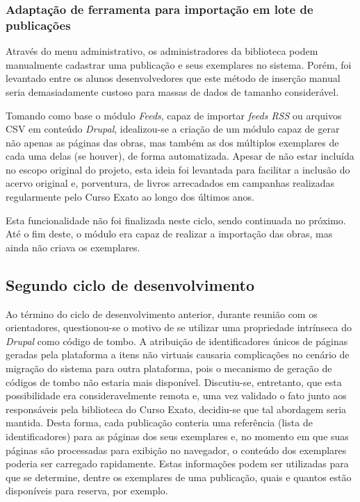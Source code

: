 \documentclass[a4paper]{article}
\begin{document}
\subsubsection{Adaptação de ferramenta para importação em lote de publicações}
Através do menu administrativo, os administradores da biblioteca podem manualmente cadastrar uma publicação e seus exemplares no sistema. Porém, foi levantado entre os alunos desenvolvedores que este método de inserção manual seria demasiadamente custoso para massas de dados de tamanho considerável.

Tomando como base o módulo \textit{Feeds}, capaz de importar \textit{feeds RSS} ou arquivos CSV em conteúdo \textit{Drupal}, idealizou-se a criação de um módulo capaz de gerar não apenas as páginas das obras, mas também as dos múltiplos exemplares de cada uma delas (se houver), de forma automatizada. Apesar de não estar incluída no escopo original do projeto, esta ideia foi levantada para facilitar a inclusão do acervo original e, porventura, de livros arrecadados em campanhas realizadas regularmente pelo Curso Exato ao longo dos últimos anos.

Esta funcionalidade não foi finalizada neste ciclo, sendo continuada no próximo. Até o fim deste, o módulo era capaz de realizar a importação das obras, mas ainda não criava os exemplares.

\pagebreak
\subsection{Segundo ciclo de desenvolvimento}

Ao término do ciclo de desenvolvimento anterior, durante reunião com os orientadores, questionou-se o motivo de se utilizar uma propriedade intrínseca do \textit{Drupal} como código de tombo. A atribuição de identificadores únicos de páginas geradas pela plataforma a itens não virtuais causaria complicações no cenário de migração do sistema para outra plataforma, pois o mecanismo de geração de códigos de tombo não estaria mais disponível. Discutiu-se, entretanto, que esta possibilidade era consideravelmente remota e, uma vez validado o fato junto aos responsáveis pela biblioteca do Curso Exato, decidiu-se que tal abordagem seria mantida. Desta forma, cada publicação conteria uma referência (lista de identificadores) para as páginas dos seus exemplares e, no momento em que suas páginas são processadas para exibição no navegador, o conteúdo dos exemplares poderia ser carregado rapidamente. Estas informações podem ser utilizadas para que se determine, dentre os exemplares de uma publicação, quais e quantos estão disponíveis para reserva, por exemplo.
\end{document}
